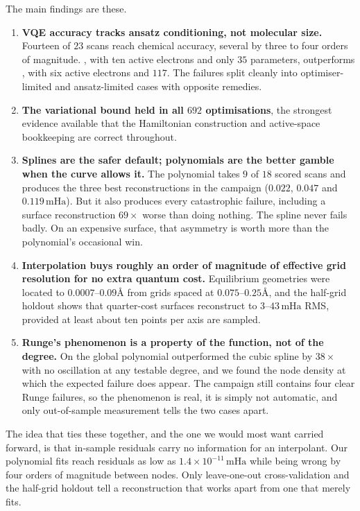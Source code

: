 \documentclass[sigconf,screen,nonacm]{acmart}
\newcommand{\mHa}{\,\text{mHa}}
\newcommand{\Ang}{\text{\AA}}
\begin{document}
The main findings are these.

\begin{enumerate}[leftmargin=1.5em]
\item \textbf{VQE accuracy tracks ansatz conditioning, not molecular size.}
Fourteen of $23$ scans reach chemical accuracy, several by three to four
orders of magnitude. , with ten active electrons and only $35$
parameters, outperforms , with six active electrons and $117$. The
failures split cleanly into optimiser-limited and ansatz-limited cases with
opposite remedies.

\item \textbf{The variational bound held in all $692$ optimisations}, the
strongest evidence available that the Hamiltonian construction and
active-space bookkeeping are correct throughout.

\item \textbf{Splines are the safer default; polynomials are the better
gamble when the curve allows it.} The polynomial takes $9$ of $18$ scored
scans and produces the three best reconstructions in the campaign ($0.022$,
$0.047$ and $0.119\mHa$). But it also produces every catastrophic failure,
including a surface reconstruction $69\times$ worse than doing nothing. The
spline never fails badly. On an expensive surface, that asymmetry is worth
more than the polynomial's occasional win.

\item \textbf{Interpolation buys roughly an order of magnitude of effective
grid resolution for no extra quantum cost.} Equilibrium geometries were
located to $0.0007$--$0.09\Ang$ from grids spaced at $0.075$--$0.25\Ang$, and
the half-grid holdout shows that quarter-cost surfaces reconstruct to
$3$--$43\mHa$ RMS, provided at least about ten points per axis are sampled.

\item \textbf{Runge's phenomenon is a property of the function, not of the
degree.} On  the global polynomial outperformed the cubic spline by
$38\times$ with no oscillation at any testable degree, and we found the node
density at which the expected failure does appear. The campaign still
contains four clear Runge failures, so the phenomenon is real, it is simply
not automatic, and only out-of-sample measurement tells the two cases apart.
\end{enumerate}

The idea that ties these together, and the one we would most want carried
forward, is that in-sample residuals carry no information for an
interpolant. Our polynomial fits reach residuals as low as
$1.4\times10^{-11}\mHa$ while being wrong by four orders of magnitude between
nodes. Only leave-one-out cross-validation and the half-grid holdout tell a
reconstruction that works apart from one that merely fits.
\end{document}
